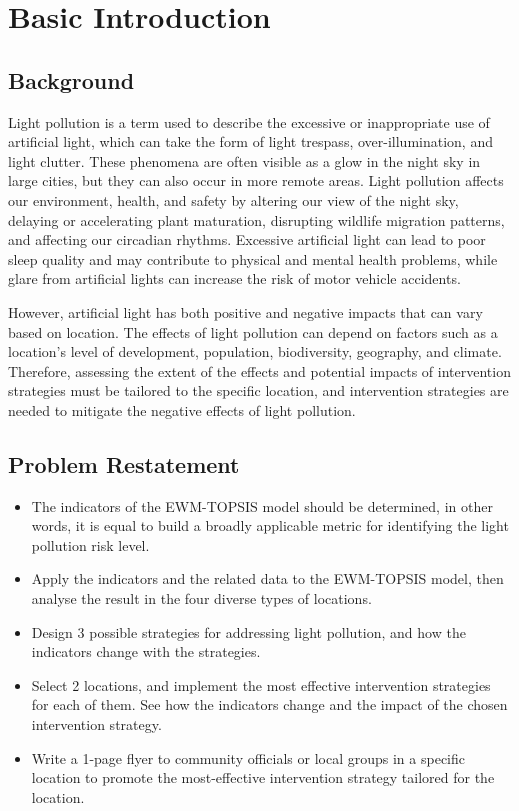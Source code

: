 \MinParskip{}

\section{Basic Introduction}

\subsection{Background}
Light pollution is a term used to describe the excessive or inappropriate use of artificial light, which can take the form of light trespass, over-illumination, and light clutter. These phenomena are often visible as a glow in the night sky in large cities, but they can also occur in more remote areas. Light pollution affects our environment, health, and safety by altering our view of the night sky, delaying or accelerating plant maturation, disrupting wildlife migration patterns, and affecting our circadian rhythms. Excessive artificial light can lead to poor sleep quality and may contribute to physical and mental health problems, while glare from artificial lights can increase the risk of motor vehicle accidents.

However, artificial light has both positive and negative impacts that can vary based on location. The effects of light pollution can depend on factors such as a location's level of development, population, biodiversity, geography, and climate. Therefore, assessing the extent of the effects and potential impacts of intervention strategies must be tailored to the specific location, and intervention strategies are needed to mitigate the negative effects of light pollution.

\subsection{Problem Restatement}
\begin{itemize}
    \item The indicators of the EWM-TOPSIS model should be determined, in other words, it is equal to build a broadly applicable metric for identifying the light pollution risk level.
    \item Apply the indicators and the related data to the EWM-TOPSIS model, then analyse the result in the four diverse types of locations.
    \item Design 3 possible strategies for addressing light pollution, and how the indicators change with the strategies.
    \item Select 2 locations, and implement the most effective intervention strategies for each of them. See how the indicators change and the impact of the chosen intervention strategy.
    \item Write a 1-page flyer to community officials or local groups in a specific location to promote the most-effective intervention strategy tailored for the location.
\end{itemize}

